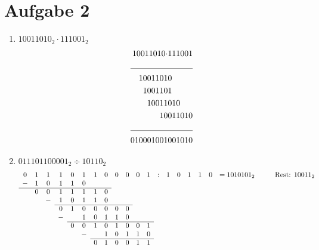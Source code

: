 \documentclass[a4paper]{article}
\begin{document}
\section*{Aufgabe 2}
\begin{enumerate}[label=\alph*)]
\item $10011010_2 \cdot 111001_2$\\
    \begin{equation}
    \begin{split}
        10011010 \cdot &111001\\
        \cline{1-2}
                1001101&0\\
                 100110&1\\
                  10011&010\\
                     10&011010\\
        \cline{1-2}
              010001001&001010\\
    \end{split}
    \end{equation}
\item $011101100001_2 \div 10110_2$
\begin{align*}
\begin{array} {ccccccccccccccccccc}
0&1&1&1&0&1&1&0&0&0&0&1&:&1&0&1&1&0& = 1010101_2 \hspace{1cm}\text{Rest: } 10011_2 \\
-&1&0&1&1&0&&&&&&&&&&&&& \\
\cline{1-8}
&0&0&1&1&1&1&0&&&&&&&&&&& \\
&&-&1&0&1&1&0&&&&&&&&&&& \\
\cline{4-10}
&&&0&1&0&0&0&0&0&&&&&&&&& \\
&&&-&&1&0&1&1&0&&&&&&&&& \\
\cline{5-12}
&&&&0&0&1&0&1&0&0&1&&&&&&& \\
&&&&&-&&1&0&1&1&0&&&&&&& \\
\cline{7-12}
&&&&&&0&1&0&0&1&1&&&&&&& \\
\end{array}
\end{align*}
\end{enumerate}
\end{document}
